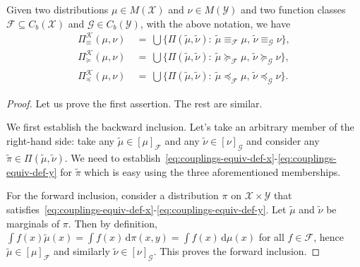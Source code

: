 \documentclass[10pt]{article}
\newcommand{\ud}{\,\mathrm{d}}
\renewcommand{\tilde}{\widetilde}
\newcommand{\calF}{\mathcal{F}}
\newcommand{\calG}{\mathcal{G}}
\newcommand{\calK}{\mathcal{K}}
\newcommand{\calX}{\mathcal{X}}
\newcommand{\calY}{\mathcal{Y}}
\numberwithin{equation}{section}
\begin{document}
\begin{lemma}\label{lem:Pi-union}
Given two distributions $\mu\in M(\mathcal{X})$ and $\nu\in M(\mathcal{Y})$ and two function classes $\calF\subseteq C_b(\calX)$ and $\calG\in C_b(\calY)$, 
with the above notation, we have
\begin{align*}
\Pi_\equiv^\calK(\mu,\nu) &~=~ \bigcup \bigl\{ \Pi(\tilde{\mu},\tilde{\nu}) :~ \tilde{\mu}\equiv_\calF \mu,\,\tilde{\nu}\equiv_\calG \nu \bigr\}, \\
\Pi_\succeq^\calK(\mu,\nu) &~=~ \bigcup \bigl\{ \Pi(\tilde{\mu},\tilde{\nu}) :~ \tilde{\mu}\succeq_\calF \mu,\,\tilde{\nu}\succeq_\calG \nu \bigr\}, \\
\Pi_\preceq^\calK(\mu,\nu) &~=~ \bigcup \bigl\{ \Pi(\tilde{\mu},\tilde{\nu}) :~ \tilde{\mu}\preceq_\calF \mu,\,\tilde{\nu}\preceq_\calG \nu \bigr\}.
\end{align*}
\end{lemma}
\begin{proof}Let us prove the first assertion. The rest are similar. 

We first establish the backward inclusion. Let's take an arbitrary member of the right-hand side: take any $\tilde{\mu}\in [\mu]_\calF$ and any $\tilde{\nu}\in[\nu]_\calG$ and consider any $\tilde{\pi}\in \Pi(\tilde{\mu},\tilde{\nu})$. We need to establish~\eqref{eq:couplings-equiv-def-x}-\eqref{eq:couplings-equiv-def-y} for $\tilde{\pi}$ which is easy using the three aforementioned memberships.

For the forward inclusion, consider a distribution $\pi$ on $\mathcal{X}\times \mathcal{Y}$ that satisfies~\eqref{eq:couplings-equiv-def-x}-\eqref{eq:couplings-equiv-def-y}. Let $\tilde{\mu}$ and $\tilde{\nu}$ be marginals of $\pi$. Then by definition, $\int f(x)\tilde{\mu}(x)=\int f(x) \ud \pi(x,y) = \int f(x)\ud \mu(x)$ for all $f\in\calF$, hence $\tilde{\mu} \in [\mu]_\calF$ and similarly $\tilde{\nu}\in [\nu]_\calG$. This proves the forward inclusion. 
\end{proof}
\end{document}
